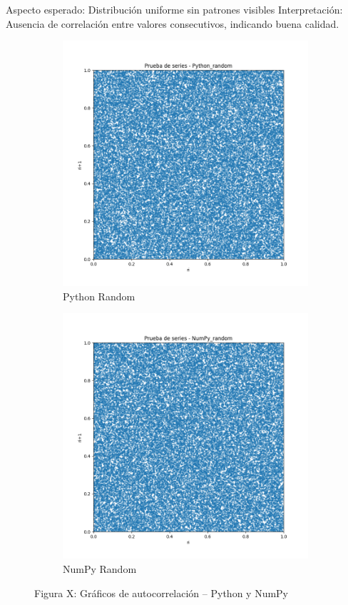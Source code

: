 \documentclass{article}
\begin{document}
Aspecto esperado: Distribución uniforme sin patrones visibles
Interpretación: Ausencia de correlación entre valores consecutivos, indicando buena calidad.
\begin{figure}[H]
\centering
\begin{subfigure}[b]{0.45\textwidth}
    \includegraphics[width=\textwidth]{Imagenes/series_Python_random.png}
    \caption{Python Random}
\end{subfigure}
\hfill
\begin{subfigure}[b]{0.45\textwidth}
    \includegraphics[width=\textwidth]{Imagenes/series_NumPy_random.png}
    \caption{NumPy Random}
\end{subfigure}
\caption{Figura X: Gráficos de autocorrelación – Python y NumPy}
\end{figure}
\end{document}

